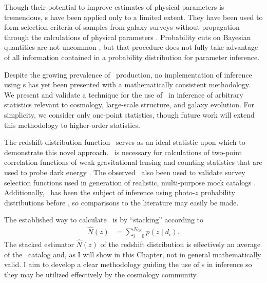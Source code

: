 

Though their potential to improve estimates of physical parameters is tremendous, \pzpdf s have been applied only to a limited extent.  
They have been used to form selection criteria of samples from galaxy surveys without propagation 
through the calculations of physical parameters \citep{VanBreukelen2009,Viironen2015}.  
Probability cuts on Bayesian quantities are not uncommon \citep{Leung2015, DiPompeo2015a}, but that procedure does not fully take advantage of all information contained in a probability distribution for parameter inference.  

Despite the growing prevalence of \pzpdf\ production, no implementation of inference using \pzpdf s has yet been presented with a mathematically consistent methodology.  
We present and validate a technique for the use of \pzpdf\ in inference of arbitrary statistics relevant to cosmology, large-scale structure, and galaxy evolution.  
For simplicity, we consider only one-point statistics, though future work will extend this methodology to higher-order statistics.

The redshift distribution function \Nz\ serves as an ideal statistic upon which to demonstrate this novel approach.  
\Nz\ is necessary for calculations of two-point correlation functions of weak gravitational lensing and counting statistics that are used to probe dark energy \citep{Masters2015}.  
The observed \Nz\ also been used to validate survey selection functions used in generation of realistic, multi-purpose mock catalogs \citep{Norberg2002}.  
Additionally, \Nz\ has been the subject of inference using photo-$z$ probability distributions before \citep{Sheldon2012, Hildebrandt2012, Kelly2014, Benjamin2013, Bonnett2015a, Viironen2015, Asorey2016, Leistedt2016}, so comparisons to the literature may easily be made. 

The established way to calculate \Nz\ is by ``stacking'' according to
\begin{align}
\label{eq:stackwithdata}
\hat{N}(z) &= \sum_{i = 0}^{N_{tot}} p(z \mid d_{i}) .
\end{align}
The stacked estimator $\hat{N}(z)$ of the redshift distribution is effectively an average of the \pzpdf\ catalog and, as I will show in this Chapter, not in general mathematically valid.
I aim to develop a clear methodology guiding the use of \pzpdf s in inference so they may be utilized effectively by the cosmology community.

